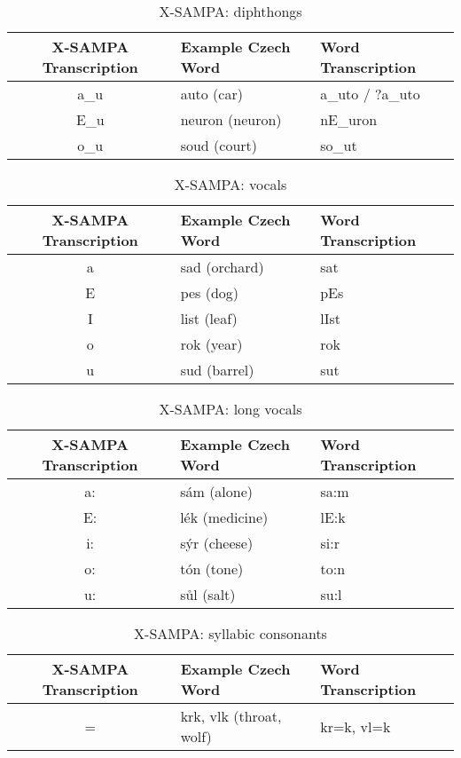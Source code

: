 \begin{table}[htpb]
\centering
\caption{X-SAMPA: diphthongs}\label{tab:sampa-diphthongs}
\begin{tabular}{|c||l|l|}\hline
    X-SAMPA Transcription & Example Czech Word & Word Transcription\\\hline\hline
    a\_u & auto (car) & a\_uto / ?a\_uto\\
    E\_u & neuron (neuron) & nE\_uron\\
    o\_u & soud (court) & so\_ut\\\hline
\end{tabular}
\end{table}

\begin{table}[htpb]
\centering
\caption{X-SAMPA: vocals}\label{tab:sampa-vocals}
\begin{tabular}{|c||l|l|}\hline
    X-SAMPA Transcription & Example Czech Word & Word Transcription\\\hline\hline
    a & sad (orchard) & sat\\
    E & pes (dog) & pEs\\
    I & list (leaf) & lIst\\
    o & rok (year) & rok\\
    u & sud (barrel) & sut\\\hline
\end{tabular}
\end{table}

\begin{table}[htpb]
\centering
\caption{X-SAMPA: long vocals}\label{tab:sampa-long-vocals}
\begin{tabular}{|c||l|l|}\hline
    X-SAMPA Transcription & Example Czech Word & Word Transcription\\\hline\hline
    a: & sám (alone) & sa:m\\
    E: & lék (medicine) & lE:k\\
    i: & sýr (cheese) & si:r\\
    o: & tón (tone) & to:n\\
    u: & sůl (salt) & su:l\\\hline
\end{tabular}
\end{table}

\begin{table}[htpb]
\centering
\caption{X-SAMPA: syllabic consonants}\label{tab:sampa-syllabic-consonant}
\begin{tabular}{|c||l|l|}\hline
    X-SAMPA Transcription & Example Czech Word & Word Transcription\\\hline\hline
    = & krk, vlk (throat, wolf) & kr=k, vl=k\\\hline
\end{tabular}
\end{table}

